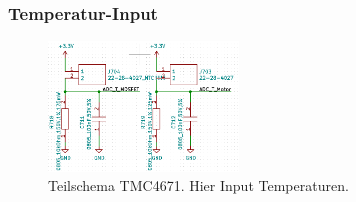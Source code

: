 \newpage

\subsubsection{Temperatur-Input}\label{subsubsec:Temperatur_Input}

\cite[PDF Schematic S.3]{trinamic_tmc-ups-10a70v--eval_nodate}
\begin{figure}[h!]
	\centering	\includegraphics[width=0.45\textwidth]{graphics/Schema_Temperaturen_LP.png}
	\caption{Teilschema TMC4671. Hier Input Temperaturen.}
	\label{fig:Schema_Encoder_LP}
\end{figure}